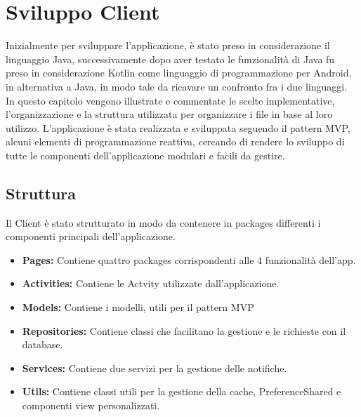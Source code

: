 \chapter{Sviluppo Client}                %
\lhead[\fancyplain{}{\bfseries\thepage}]{\fancyplain{}{\bfseries\rightmark}}

Inizialmente per sviluppare l'applicazione, è stato preso in considerazione il linguaggio Java, successivamente dopo aver testato le funzionalità di Java fu preso in considerazione Kotlin come linguaggio di programmazione per Android, in alternativa a Java, in modo tale da ricavare un confronto fra i due linguaggi.\\
In questo capitolo vengono illustrate e commentate le scelte implementative, l'organizzazione e la struttura utilizzata per organizzare i file in base al loro utilizzo.
L'applicazione è stata realizzata e sviluppata seguendo il pattern MVP, alcuni elementi di programmazione reattiva, cercando di rendere lo sviluppo di tutte le componenti dell'applicazione modulari e facili da gestire.



\newpage

\section{Struttura}
Il Client è stato strutturato in modo da contenere in packages differenti i componenti principali dell'applicazione.
\begin{itemize}
    \item \textbf{Pages:} Contiene quattro packages corrispondenti alle 4 funzionalità dell'app.
    \item \textbf{Activities:} Contiene le Actvity utilizzate dall'applicazione.
    \item \textbf{Models:} Contiene i modelli, utili per il pattern MVP
    \item \textbf{Repositories:} Contiene classi che facilitano la gestione e le richieste con il database.
    \item \textbf{Services:} Contiene due servizi per la gestione delle notifiche.
    \item \textbf{Utils:} Contiene classi utili per la gestione della cache, PreferenceShared e componenti view personalizzati.
\end{itemize}


